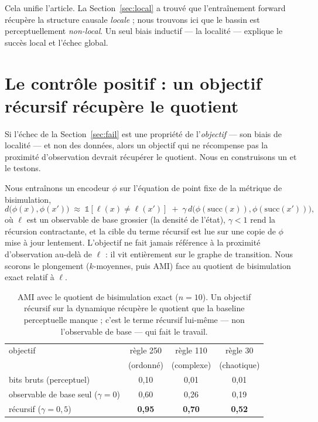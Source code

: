 \documentclass[11pt]{article}
\newcommand{\succf}{\mathrm{succ}}
\begin{document}
Cela unifie l'article. La Section~\ref{sec:local} a trouvé que l'entraînement
forward récupère la structure causale \emph{locale} ; nous trouvons ici que le
bassin est perceptuellement \emph{non-local}. Un seul biais inductif --- la
localité --- explique le succès local et l'échec global.

\section{Le contrôle positif : un objectif récursif récupère le quotient}
\label{sec:positive}

Si l'échec de la Section~\ref{sec:fail} est une propriété de l'\emph{objectif}
--- son biais de localité --- et non des données, alors un objectif qui ne
récompense pas la proximité d'observation devrait récupérer le quotient. Nous en
construisons un et le testons.

Nous entraînons un encodeur $\phi$ sur l'équation de point fixe de la métrique
de bisimulation,
\[
  d\big(\phi(x),\phi(x')\big) \;\approx\;
  \mathbb{1}[\ell(x)\neq\ell(x')] \;+\; \gamma\,
  d\big(\phi(\succf(x)),\phi(\succf(x'))\big),
\]
où $\ell$ est un observable de base grossier (la densité de l'état), $\gamma<1$
rend la récursion contractante, et la cible du terme récursif est lue sur une
copie de $\phi$ mise à jour lentement. L'objectif ne fait jamais référence à la
proximité d'observation au-delà de $\ell$ : il vit entièrement sur le graphe de
transition. Nous scorons le plongement ($k$-moyennes, puis AMI) face au quotient
de bisimulation exact relatif à $\ell$.

\begin{table}[h]
\centering
\caption{AMI avec le quotient de bisimulation exact ($n{=}10$). Un objectif
récursif sur la dynamique récupère le quotient que la baseline perceptuelle
manque ; c'est le terme récursif lui-même --- non l'observable de base --- qui
fait le travail.}
\label{tab:positive}
\begin{tabular}{lccc}
\toprule
objectif & règle 250 & règle 110 & règle 30 \\
         & (ordonné) & (complexe) & (chaotique) \\
\midrule
bits bruts (perceptuel)                & 0,10 & 0,01 & 0,01 \\
observable de base seul ($\gamma{=}0$) & 0,60 & 0,26 & 0,19 \\
récursif ($\gamma{=}0{,}5$)            & \textbf{0,95} & \textbf{0,70} & \textbf{0,52} \\
\bottomrule
\end{tabular}
\end{table}
\end{document}

